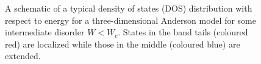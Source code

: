 \documentclass[10pt,a4paper]{article}
\begin{document}
\begin{minipage}[t]{0.42\textwidth}
\begin{figure}[H]
\caption{A schematic of a typical density of states (DOS) distribution with respect to energy for a three-dimensional Anderson model for some intermediate disorder $W<W_c$. States in the band tails (coloured red) are localized while those in the middle (coloured blue) are extended. }
\label{fig:DOS} 
\end{figure}
\end{minipage}
\end{document}
